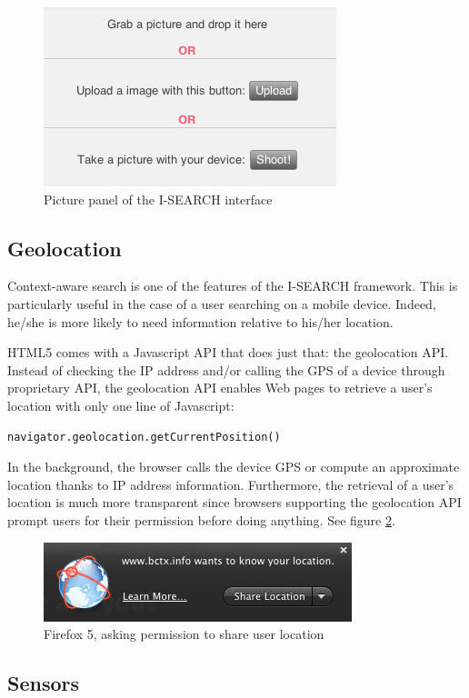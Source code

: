 \documentclass[runningheads,a4paper]{llncs} \usepackage[utf8]{inputenc}
\begin{document}
\begin{figure}[h!]
  \centering
    \includegraphics[width=0.3\linewidth]{resources/input-picture.png}
  \caption{Picture panel of the \mbox{I-SEARCH} interface}
  \label{fig:input-picture}
\end{figure}

\subsection{Geolocation}
Context-aware search is one of the features of the \mbox{I-SEARCH} framework. This is particularly useful in the case of a user searching on a mobile device. Indeed, he/she is more likely to need information relative to his/her location.

HTML5 comes with a Javascript API that does just that: the geolocation API. Instead of checking the IP address and/or calling the GPS of a device through proprietary API, the geolocation API enables Web pages to retrieve a user's location with only one line of Javascript: 
\begin{lstlisting}
navigator.geolocation.getCurrentPosition()
\end{lstlisting}
In the background, the browser calls the device GPS or compute an approximate location thanks to IP address information. Furthermore, the retrieval of a user's location is much more transparent since browsers supporting the geolocation API prompt users for their permission before doing anything. See figure \ref{fig:geolocation-prompt}.

\begin{figure}[h!]
  \centering
    \includegraphics[width=0.3\linewidth]{resources/geolocation-prompt.png}
  \caption{Firefox 5, asking permission to share user location}
  \label{fig:geolocation-prompt}
\end{figure}


\subsection{Sensors}
\end{document}
